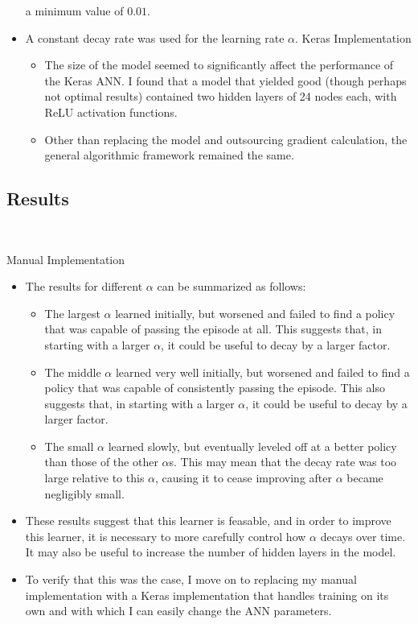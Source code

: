 \documentclass[a4paper]{article}
\begin{document}
\begin{itemize}
        a minimum value of $0.01$.
    \item A constant decay rate was used for the learning rate $\alpha$.
Keras Implementation
\begin{itemize}
    \item The size of the model seemed to significantly affect the performance
        of the Keras ANN. I found that a model that yielded good (though
        perhaps not optimal results) contained two hidden layers of 24 nodes
        each, with ReLU activation functions.
    \item Other than replacing the model and outsourcing gradient calculation,
        the general algorithmic framework remained the same.
\end{itemize}
\end{itemize}
\subsection*{Results}
\begin{centering}
    \scalebox{0.6}{} \\
\end{centering}
Manual Implementation
\begin{itemize}
    \item The results for different $\alpha$ can be summarized as follows:
    \begin{itemize}
        \item The largest $\alpha$ learned initially, but worsened and
            failed to find a policy that was capable of passing the episode at
            all. This suggests that, in starting with a larger $\alpha$, it
            could be useful to decay by a larger factor.
        \item The middle $\alpha$ learned very well initially, but 
            worsened and failed to find a policy that was capable of
            consistently passing the episode.  This also suggests that, in
            starting with a larger $\alpha$, it could be useful to decay by a
            larger factor.
        \item The small $\alpha$ learned slowly, but eventually leveled off at
            a better policy than those of the other $\alpha$s. This may mean
            that the decay rate was too large relative to this $\alpha$, causing
            it to cease improving after $\alpha$ became negligibly small.
    \end{itemize}
    \item These results suggest that this learner is feasable, and in order to
        improve this learner, it is necessary to more carefully control how
        $\alpha$ decays over time. It may also be useful to increase the number
        of hidden layers in the model. 
    \item To verify that this was the case,
        I move on to replacing my manual implementation with a Keras 
        implementation that handles training on its own and with which I can
        easily change the ANN parameters.
\end{itemize}
\end{document}
